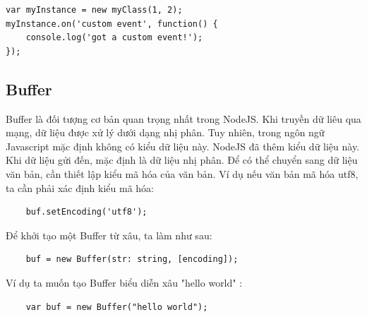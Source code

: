 	\begin{verbatim}
var myInstance = new myClass(1, 2);
myInstance.on('custom event', function() {
	console.log('got a custom event!');
});
	\end{verbatim}
	\subsection{Buffer}
		Buffer là đối tượng cơ bản quan trọng nhất trong NodeJS. Khi truyền dữ liêu qua mạng, dữ liệu được xử lý dưới dạng nhị phân. Tuy nhiên, trong ngôn ngữ Javascript mặc định không có kiểu dữ liệu này. NodeJS đã thêm kiểu dữ liệu này. Khi dữ liệu gửi đến, mặc định là dữ liệu nhị phân. Để có thể chuyển sang dữ liệu văn bản, cần thiết lập kiểu mã hóa của văn bản. Ví dụ nếu văn bản mã hóa utf8, ta cần phải xác định kiểu mã hóa:\\
		\begin{verbatim}
	buf.setEncoding('utf8');
		\end{verbatim}
		
		Để khởi tạo một Buffer từ xâu, ta làm như sau:\\
		\begin{verbatim}
	buf = new Buffer(str: string, [encoding]);
		\end{verbatim}
		
		Ví dụ ta muốn tạo Buffer biểu diễn xâu "hello world" :
		\begin{verbatim}
	var buf = new Buffer("hello world");
		\end{verbatim}
		
